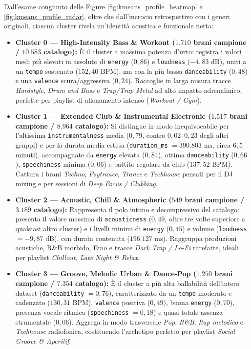 Dall'esame congiunto delle Figure \ref{fig:kmeans_profile_heatmap} e \ref{fig:kmeans_profile_radar}, oltre che dall'incrocio retrospettivo con i generi originali, ciascun cluster rivela un'identità acustica e funzionale netta:
\begin{itemize}
    \item \textbf{Cluster 0 — High-Intensity Bass \& Workout ($1.710$ brani campione / $10.583$ catalogo):} È il cluster a massima potenza d'urto: registra i valori medi più elevati in assoluto di \texttt{energy} ($0,86$) e \texttt{loudness} ($-4,83\text{ dB}$), uniti a un \texttt{tempo} sostenuto ($152,40\text{ BPM}$), ma con la più bassa \texttt{danceability} ($0,48$) e una \texttt{valence} scura/aggressiva ($0,24$). Raccoglie in larga misura tracce \textit{Hardstyle}, \textit{Drum and Bass} e \textit{Trap/Trap Metal} ad alto impatto adrenalinico, perfette per playlist di allenamento intenso (\textit{Workout / Gym}).
    \item \textbf{Cluster 1 — Extended Club \& Instrumental Electronic ($1.517$ brani campione / $8.964$ catalogo):} Si distingue in modo inequivocabile per l'altissima \texttt{instrumentalness} media ($0,79$, contro $0,02\text{--}0,23$ degli altri gruppi) e per la durata media estesa (\texttt{duration\_ms} $= 390.803\text{ ms}$, circa $6,5$ minuti), accompagnate da \texttt{energy} elevata ($0,84$), ottima \texttt{danceability} ($0,66$), \texttt{speechiness} minima ($0,06$) e battito regolare da club ($137,52\text{ BPM}$). Cattura i brani \textit{Techno}, \textit{Psytrance}, \textit{Trance} e \textit{Techhouse} pensati per il DJ mixing e per sessioni di \textit{Deep Focus / Clubbing}.
    \item \textbf{Cluster 2 — Acoustic, Chill \& Atmospheric ($549$ brani campione / $3.189$ catalogo):} Rappresenta il polo intimo e decompressivo del catalogo: presenta il valore massimo di \texttt{acousticness} ($0,49$, oltre tre volte superiore a qualsiasi altro cluster) e i livelli minimi di \texttt{energy} ($0,45$) e volume (\texttt{loudness} $= -9,87\text{ dB}$), con durata contenuta ($196.127\text{ ms}$). Raggruppa produzioni acustiche, R\&B morbido, Emo e tracce \textit{Dark Trap / Lo-Fi} rarefatte, ideali per playlist \textit{Chillout, Late Night \& Relax}.
    \item \textbf{Cluster 3 — Groove, Melodic Urban \& Dance-Pop ($1.250$ brani campione / $7.354$ catalogo):} È il cluster a più alta ballabilità dell'intero dataset (\texttt{danceability} $= 0,76$), caratterizzato da un \texttt{tempo} moderato e cadenzato ($130,31\text{ BPM}$), \texttt{valence} positiva ($0,49$), buona \texttt{energy} ($0,70$), presenza vocale ritmica (\texttt{speechiness} $= 0,18$) e quasi totale assenza strumentale ($0,06$). Aggrega in modo trasversale \textit{Pop}, \textit{R\&B}, \textit{Rap melodico} e \textit{Techhouse} radiofonica, costituendo l'archetipo perfetto per playlist \textit{Social Groove \& Aperitif}.

\end{itemize}
